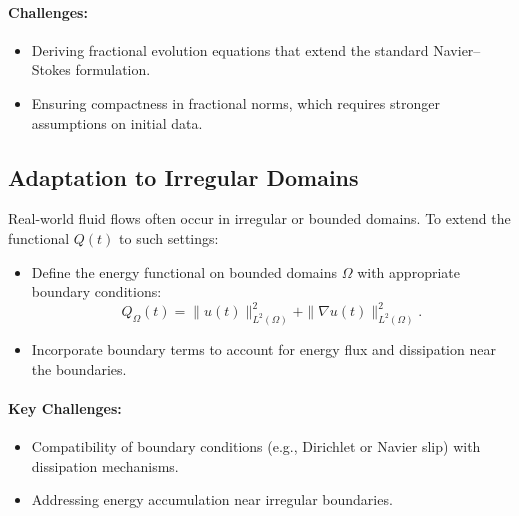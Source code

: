 \documentclass[12pt]{article}
\theoremstyle{definition}
\begin{document}
\paragraph{Challenges:}
\begin{itemize}
    \item Deriving fractional evolution equations that extend the standard Navier--Stokes formulation.
    \item Ensuring compactness in fractional norms, which requires stronger assumptions on initial data.
\end{itemize}

\subsection{Adaptation to Irregular Domains}
Real-world fluid flows often occur in irregular or bounded domains. To extend the functional $Q(t)$ to such settings:
\begin{itemize}
    \item Define the energy functional on bounded domains $\Omega$ with appropriate boundary conditions:
    \[
    Q_\Omega(t) = \|u(t)\|_{L^2(\Omega)}^2 + \|\nabla u(t)\|_{L^2(\Omega)}^2.
    \]
    \item Incorporate boundary terms to account for energy flux and dissipation near the boundaries.
\end{itemize}

\paragraph{Key Challenges:}
\begin{itemize}
    \item Compatibility of boundary conditions (e.g., Dirichlet or Navier slip) with dissipation mechanisms.
    \item Addressing energy accumulation near irregular boundaries.
\end{itemize}
\end{document}
